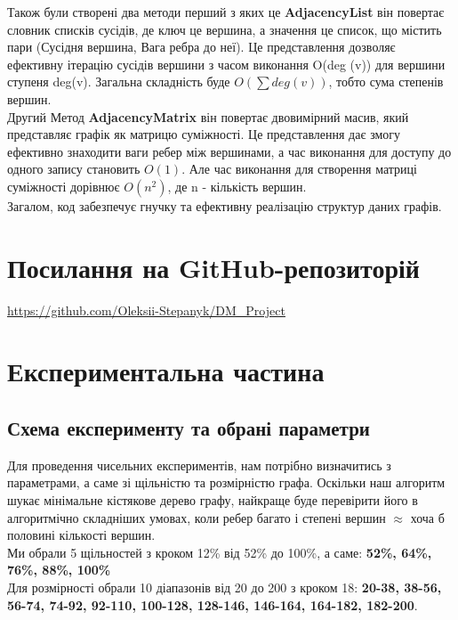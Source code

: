\documentclass[titlepage, a4paper]{article}
\begin{document}
Також були створені два методи перший з яких це \textbf {AdjacencyList} він повертає словник списків сусідів, де ключ це вершина, а значення це список, що містить пари (Сусідня вершина, Вага ребра до неї). Це представлення дозволяє ефективну ітерацію сусідів вершини з часом виконання O(deg (v)) для вершини ступеня deg(v). Загальна складність буде $O(\sum deg(v))$, тобто сума степенів вершин.\\

Другий Метод \textbf{AdjacencyMatrix} він повертає двовимірний масив, який представляє графік як матрицю суміжності. Це представлення дає змогу ефективно знаходити ваги ребер між вершинами, а час виконання для доступу до одного запису становить $O(1)$. Але час виконання для створення матриці суміжності дорівнює $O(n^{2})$, де n - кількість вершин.\\
Загалом, код забезпечує гнучку та ефективну реалізацію структур даних графів.


\section{Посилання на GitHub-репозиторій}
\url{https://github.com/Oleksii-Stepanyk/DM_Project}

\section{Експериментальна частина}
\subsection{Схема експерименту та обрані параметри}
Для проведення чисельних експериментів, нам потрібно визначитись з параметрами, а саме зі щільністю та розмірністю графа.
Оскільки наш алгоритм шукає мінімальне кістякове дерево графу, найкраще буде перевірити його в алгоритмічно складніших умовах, коли ребер багато і степені вершин $\approx$ хоча б половині кількості вершин.\\

Ми обрали 5 щільностей з кроком 12\% від 52\% до 100\%, а саме: \textbf{52\%, 64\%, 76\%, 88\%, 100\%} \\
Для розмірності обрали 10 діапазонів від 20 до 200 з кроком 18: \textbf{20-38, 38-56, 56-74, 74-92, 92-110, 100-128, 128-146, 146-164, 164-182, 182-200}.\\
\end{document}
